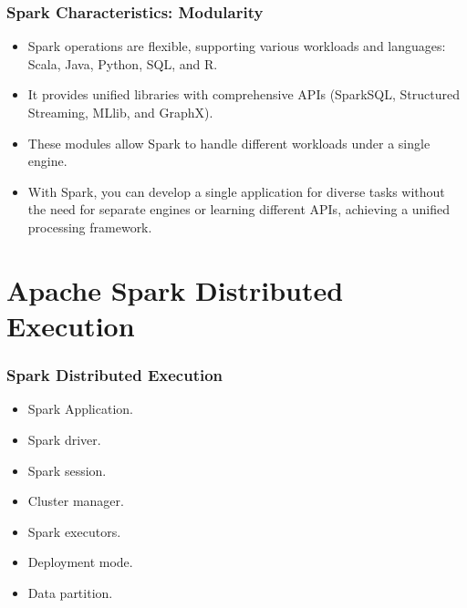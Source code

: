 \begin{frame}
    \frametitle{Spark Characteristics: Modularity}
    \begin{itemize}
        \item Spark operations are flexible, supporting various workloads and languages: Scala, Java, Python, SQL, and R. \pause
        \item It provides unified libraries with comprehensive APIs (SparkSQL, Structured Streaming, MLlib, and GraphX). \pause
        \item These modules allow Spark to handle different workloads under a single engine. \pause
        \item With Spark, you can develop a single application for diverse tasks without the need for separate engines or learning different APIs, achieving a unified processing framework. \pause
    \end{itemize}
\end{frame}



\section{Apache Spark Distributed Execution}\label{sec:apache-spark-distributed-execution}
\begin{frame}
    \frametitle{Spark Distributed Execution}
    \begin{itemize}
        \item Spark Application. \pause
        \item Spark driver. \pause
        \item Spark session. \pause
        \item Cluster manager. \pause
        \item Spark executors. \pause
        \item Deployment mode. \pause
        \item Data partition. \pause
    \end{itemize}
\end{frame}

